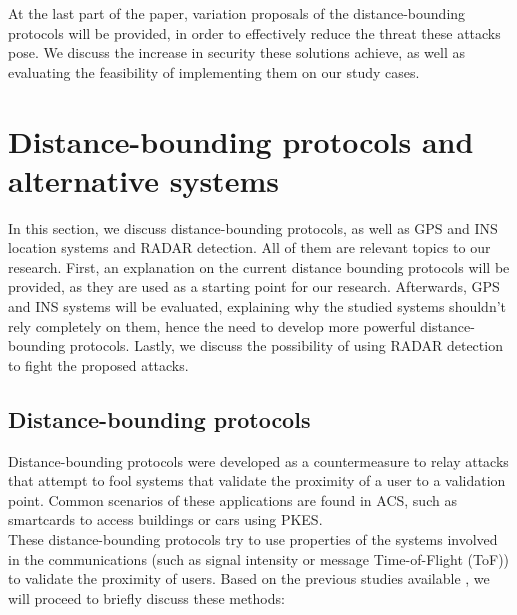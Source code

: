 \documentclass{article}
\begin{document}
At the last part of the paper, variation proposals of the distance-bounding protocols will be provided, in order to effectively reduce the threat these attacks pose. We discuss the increase in security these solutions achieve, as well as evaluating the feasibility of implementing them on our study cases.\\













\section{Distance-bounding protocols and alternative systems}
\label{sec:dbandalternative}

In this section, we discuss distance-bounding protocols, as well as GPS and INS location systems and RADAR detection. All of them are relevant topics to our research. First, an explanation on the current distance bounding protocols will be provided, as they are used as a starting point for our research. Afterwards, GPS and INS systems will be evaluated, explaining why the studied systems shouldn't rely completely on them, hence the need to develop more powerful distance-bounding protocols. Lastly, we discuss the possibility of using RADAR detection to fight the proposed attacks.\\

\subsection{Distance-bounding protocols}

Distance-bounding protocols were developed as a countermeasure to relay attacks that attempt to fool systems that validate the proximity of a user to a validation point. Common scenarios of these applications are found in ACS, such as smartcards to access buildings or cars using PKES.\\

These distance-bounding protocols try to use properties of the systems involved in the communications (such as signal intensity or message Time-of-Flight (ToF)) to validate the proximity of users. Based on the previous studies available \cite{capkun2006secure}, we will proceed to briefly discuss these methods:\\
\end{document}
